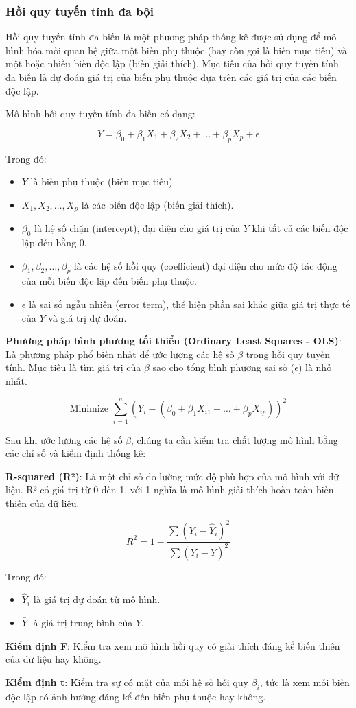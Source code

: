 \subsubsection{Hồi quy tuyến tính đa bội}
Hồi quy tuyến tính đa biến là một phương pháp thống kê được sử dụng để mô hình hóa mối quan hệ giữa một biến phụ thuộc (hay còn gọi là biến mục tiêu) và một hoặc nhiều biến độc lập (biến giải thích). Mục tiêu của hồi quy tuyến tính đa biến là dự đoán giá trị của biến phụ thuộc dựa trên các giá trị của các biến độc lập.

Mô hình hồi quy tuyến tính đa biến có dạng:

\[
Y = \beta_0 + \beta_1 X_1 + \beta_2 X_2 + \dots + \beta_p X_p + \epsilon
\]

Trong đó:
\begin{itemize}
  \item \(Y\) là biến phụ thuộc (biến mục tiêu).
  \item \(X_1, X_2, \dots, X_p\) là các biến độc lập (biến giải thích).
  \item \(\beta_0\) là hệ số chặn (intercept), đại diện cho giá trị của \(Y\) khi tất cả các biến độc lập đều bằng 0.
  \item \(\beta_1, \beta_2, \dots, \beta_p\) là các hệ số hồi quy (coefficient) đại diện cho mức độ tác động của mỗi biến độc lập đến biến phụ thuộc.
  \item \(\epsilon\) là sai số ngẫu nhiên (error term), thể hiện phần sai khác giữa giá trị thực tế của \(Y\) và giá trị dự đoán.
\end{itemize}

\textbf{Phương pháp bình phương tối thiểu (Ordinary Least Squares - OLS)}: Là phương pháp phổ biến nhất để ước lượng các hệ số \(\beta\) trong hồi quy tuyến tính. Mục tiêu là tìm giá trị của \(\beta\) sao cho tổng bình phương sai số (\(\epsilon\)) là nhỏ nhất.
  
\[
\text{Minimize } \sum_{i=1}^{n} (Y_i - (\beta_0 + \beta_1 X_{i1} + \dots + \beta_p X_{ip}))^2
\]

Sau khi ước lượng các hệ số \(\beta\), chúng ta cần kiểm tra chất lượng mô hình bằng các chỉ số và kiểm định thống kê:

\textbf{R-squared (R²)}: Là một chỉ số đo lường mức độ phù hợp của mô hình với dữ liệu. R² có giá trị từ 0 đến 1, với 1 nghĩa là mô hình giải thích hoàn toàn biến thiên của dữ liệu.
  
  \[
  R^2 = 1 - \frac{\sum (Y_i - \hat{Y}_i)^2}{\sum (Y_i - \bar{Y})^2}
  \]
  
  Trong đó:
  \begin{itemize}
    \item \(\hat{Y}_i\) là giá trị dự đoán từ mô hình.
    \item \(\bar{Y}\) là giá trị trung bình của \(Y\).
  \end{itemize}

\textbf{Kiểm định F}: Kiểm tra xem mô hình hồi quy có giải thích đáng kể biến thiên của dữ liệu hay không.

\textbf{Kiểm định t}: Kiểm tra sự có mặt của mỗi hệ số hồi quy \(\beta_i\), tức là xem mỗi biến độc lập có ảnh hưởng đáng kể đến biến phụ thuộc hay không.
